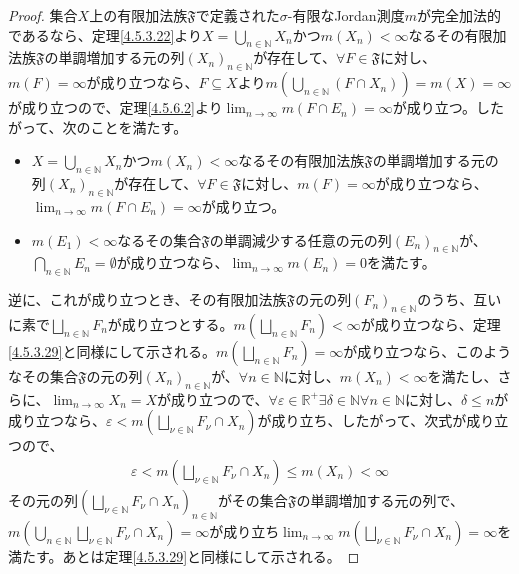 \documentclass[dvipdfmx]{jsarticle}
\begin{document}
\begin{proof}
集合$X$上の有限加法族$\mathfrak{F}$で定義された$\sigma$-有限なJordan測度$m$が完全加法的であるなら、定理\ref{4.5.3.22}より$X = \bigcup_{n \in \mathbb{N}} X_{n}$かつ$m\left( X_{n} \right) < \infty$なるその有限加法族$\mathfrak{F}$の単調増加する元の列$\left( X_{n} \right)_{n \in \mathbb{N}}$が存在して、$\forall F \in \mathfrak{F}$に対し、$m(F) = \infty$が成り立つなら、$F \subseteq X$より$m\left( \bigcup_{n \in \mathbb{N}} \left( F \cap X_{n} \right) \right) = m(X) = \infty$が成り立つので、定理\ref{4.5.6.2}より$\lim_{n \rightarrow \infty}{m\left( F \cap E_{n} \right)} = \infty$が成り立つ。したがって、次のことを満たす。
\begin{itemize}
\item
  $X = \bigcup_{n \in \mathbb{N}} X_{n}$かつ$m\left( X_{n} \right) < \infty$なるその有限加法族$\mathfrak{F}$の単調増加する元の列$\left( X_{n} \right)_{n \in \mathbb{N}}$が存在して、$\forall F \in \mathfrak{F}$に対し、$m(F) = \infty$が成り立つなら、$\lim_{n \rightarrow \infty}{m\left( F \cap E_{n} \right)} = \infty$が成り立つ。
\item
  $m\left( E_{1} \right) < \infty$なるその集合$\mathfrak{F}$の単調減少する任意の元の列$\left( E_{n} \right)_{n \in \mathbb{N}}$が、$\bigcap_{n \in \mathbb{N}} E_{n} = \emptyset$が成り立つなら、$\lim_{n \rightarrow \infty}{m\left( E_{n} \right)} = 0$を満たす。
\end{itemize}\par
逆に、これが成り立つとき、その有限加法族$\mathfrak{F}$の元の列$\left( F_{n} \right)_{n \in \mathbb{N}}$のうち、互いに素で$\bigsqcup_{n \in \mathbb{N}} F_{n}$が成り立つとする。$m\left( \bigsqcup_{n \in \mathbb{N}} F_{n} \right) < \infty$が成り立つなら、定理\ref{4.5.3.29}と同様にして示される。$m\left( \bigsqcup_{n \in \mathbb{N}} F_{n} \right) = \infty$が成り立つなら、このようなその集合$\mathfrak{F}$の元の列$\left( X_{n} \right)_{n \in \mathbb{N}}$が、$\forall n \in \mathbb{N}$に対し、$m\left( X_{n} \right) < \infty$を満たし、さらに、$\lim_{n \rightarrow \infty}X_{n} = X$が成り立つので、$\forall\varepsilon \in \mathbb{R}^{+}\exists\delta \in \mathbb{N}\forall n \in \mathbb{N}$に対し、$\delta \leq n$が成り立つなら、$\varepsilon < m\left( \bigsqcup_{\nu \in \mathbb{N}} F_{\nu} \cap X_{n} \right)$が成り立ち、したがって、次式が成り立つので、
\begin{align*}
\varepsilon < m\left( \bigsqcup_{\nu \in \mathbb{N}} F_{\nu} \cap X_{n} \right) \leq m\left( X_{n} \right) < \infty
\end{align*}
その元の列$\left( \bigsqcup_{\nu \in \mathbb{N}} F_{\nu} \cap X_{n} \right)_{n \in \mathbb{N}}$がその集合$\mathfrak{F}$の単調増加する元の列で、$m\left( \bigcup_{n \in \mathbb{N}} {\bigsqcup_{\nu \in \mathbb{N}} F_{\nu} \cap X_{n}} \right) = \infty$が成り立ち$\lim_{n \rightarrow \infty}{m\left( \bigsqcup_{\nu \in \mathbb{N}} F_{\nu} \cap X_{n} \right)} = \infty$を満たす。あとは定理\ref{4.5.3.29}と同様にして示される。
\end{proof}
\end{document}
